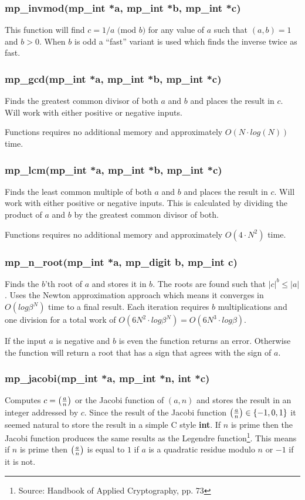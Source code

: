 \documentclass{article}
\begin{document}
\subsubsection{mp\_invmod(mp\_int *a, mp\_int *b, mp\_int *c)}
This function will find $c = 1/a \mbox{ (mod }b\mbox{)}$ for any value of $a$ such that $(a, b) = 1$ and $b > 0$.  When
$b$ is odd a ``fast'' variant is used which finds the inverse twice as fast.  

\subsubsection{mp\_gcd(mp\_int *a, mp\_int *b, mp\_int *c)}
Finds the greatest common divisor of both $a$ and $b$ and places the result in $c$.  Will work with either positive
or negative inputs.  

Functions requires no additional memory and approximately $O(N \cdot log(N))$ time.

\subsubsection{mp\_lcm(mp\_int *a, mp\_int *b, mp\_int *c)}
Finds the least common multiple of both $a$ and $b$ and places the result in $c$.  Will work with either positive
or negative inputs.  This is calculated by dividing the product of $a$ and $b$ by the greatest common divisor of 
both.  

Functions requires no additional memory and approximately $O(4 \cdot N^2)$ time.

\subsubsection{mp\_n\_root(mp\_int *a, mp\_digit b, mp\_int c)}
Finds the $b$'th root of $a$ and stores it in $b$.  The roots are found such that $\vert c \vert^b \le \vert a \vert$.  
Uses the Newton approximation approach which means it converges in $O(log \beta^N)$ time to a final result.  Each iteration
requires $b$ multiplications and one division for a total work of $O(6N^2 \cdot log \beta^N) = O(6N^3 \cdot log \beta)$.

If the input $a$ is negative and $b$ is even the function returns an error.  Otherwise the function will return a root
that has a sign that agrees with the sign of $a$.

\subsubsection{mp\_jacobi(mp\_int *a, mp\_int *n, int *c)}
Computes $c = \left ( {a \over n} \right )$ or the Jacobi function of $(a, n)$ and stores the result in an integer addressed
by $c$.  Since the result of the Jacobi function $\left ( {a \over n} \right ) \in \lbrace -1, 0, 1 \rbrace$ it seemed
natural to store the result in a simple C style \textbf{int}.  If $n$ is prime then the Jacobi function produces
the same results as the Legendre function\footnote{Source: Handbook of Applied Cryptography, pp. 73}.  This means if
$n$ is prime then $\left ( {a \over n} \right )$ is equal to $1$ if $a$ is a quadratic residue modulo $n$ or $-1$ if 
it is not.
\end{document}
